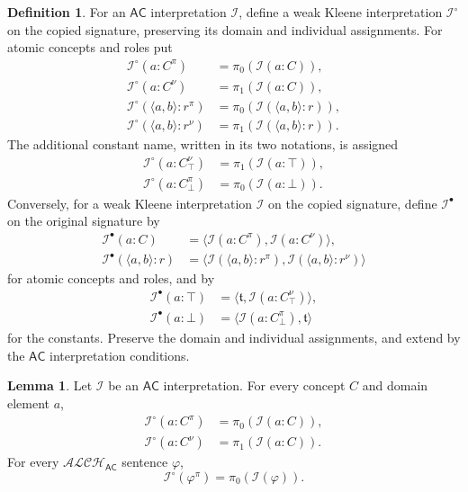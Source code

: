 \documentclass[letterpaper]{article} %
\theoremstyle{definition}
\newtheorem{lemma}{Lemma}
\theoremstyle{definition}
\newtheorem{definition}{Definition}
\theoremstyle{definition}
\theoremstyle{definition}
\theoremstyle{definition}
\newcommand{\vt}{\mathfrak{t}}
\begin{document}
\begin{definition}\label{def:coordinate-interpretations}
For an $\mathsf{AC}$ interpretation $\mathcal{I}$, define a weak Kleene interpretation $\mathcal{I}^{\circ}$ on the copied signature, preserving its domain and individual assignments. For atomic concepts and roles put
\begin{align*}
\mathcal{I}^{\circ}(a:C^{\pi})&=\pi_0(\mathcal{I}(a:C)),\\
\mathcal{I}^{\circ}(a:C^{\nu})&=\pi_1(\mathcal{I}(a:C)),\\
\mathcal{I}^{\circ}(\langle a,b\rangle:r^{\pi})&=\pi_0(\mathcal{I}(\langle a,b\rangle:r)),\\
\mathcal{I}^{\circ}(\langle a,b\rangle:r^{\nu})&=\pi_1(\mathcal{I}(\langle a,b\rangle:r)).
\end{align*}
The additional constant name, written in its two notations, is assigned
\begin{align*}
\mathcal{I}^{\circ}(a:C_{\top}^{\nu})&=\pi_1(\mathcal{I}(a:\top)),\\
\mathcal{I}^{\circ}(a:C_{\bot}^{\pi})&=\pi_0(\mathcal{I}(a:\bot)).
\end{align*}
Conversely, for a weak Kleene interpretation $\mathcal{I}$ on the copied signature, define $\mathcal{I}^{\bullet}$ on the original signature by
\begin{align*}
\mathcal{I}^{\bullet}(a:C)
 &=\langle\mathcal{I}(a:C^{\pi}),\mathcal{I}(a:C^{\nu})\rangle,\\
\mathcal{I}^{\bullet}(\langle a,b\rangle:r)
 &=\langle\mathcal{I}(\langle a,b\rangle:r^{\pi}),\mathcal{I}(\langle a,b\rangle:r^{\nu})\rangle
\end{align*}
for atomic concepts and roles, and by
\begin{align*}
\mathcal{I}^{\bullet}(a:\top)&=\langle\vt,\mathcal{I}(a:C_{\top}^{\nu})\rangle,\\
\mathcal{I}^{\bullet}(a:\bot)&=\langle\mathcal{I}(a:C_{\bot}^{\pi}),\vt\rangle
\end{align*}
for the constants. Preserve the domain and individual assignments, and extend by the $\mathsf{AC}$ interpretation conditions.
\end{definition}

\begin{lemma}\label{lem:ALCH-AC-interpretations}
Let $\mathcal{I}$ be an $\mathsf{AC}$ interpretation. For every concept $C$ and domain element $a$,
\begin{align*}
\mathcal{I}^{\circ}(a:C^{\pi})&=\pi_0(\mathcal{I}(a:C)),\\
\mathcal{I}^{\circ}(a:C^{\nu})&=\pi_1(\mathcal{I}(a:C)).
\end{align*}
For every $\mathcal{ALCH}_{\mathsf{AC}}$ sentence $\varphi$,
\[
\mathcal{I}^{\circ}(\varphi^{\pi})=\pi_0(\mathcal{I}(\varphi)).
\]
\end{lemma}
\end{document}
